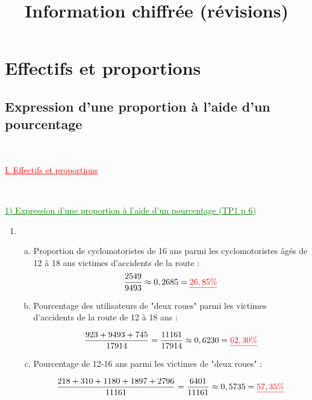 \documentclass[xcolor={dvipsnames}]{beamer}
\title{Information chiffrée (révisions)}
\begin{document}
\begin{frame}
  \titlepage 
\end{frame}


	



\section{Effectifs et proportions}

\subsection{Expression d'une proportion à l'aide d'un pourcentage }


\begin{frame}
\

\begin{Large}
	\textcolor{Red}{\underline{I. Effectifs et proportions }}
\end{Large}\pause
\

\vspace*{1cm}

\textcolor{Green}{\underline{1) Expression d'une proportion à l'aide d'un pourcentage (TP1 p 6)}}
\end{frame}

\begin{frame}{}
	
\begin{enumerate}%
	\item 
	\begin{enumerate} [a)]
		\item Proportion de cyclomotoristes de 16 ans parmi les cyclomotoristes âgés de 12 à 18 ans victimes d'accidents de la route :\pause
		\begin{eqnarray*}
			\dfrac{2549}{9493} \approx 0,2685 = \textcolor{red}{\underline{26,85\%}}
		\end{eqnarray*}\pause
		
		\item Pourcentage des utilisateurs de "deux roues" parmi les victimes d'accidents de la route de 12 à 18 ans :\pause
		
		\begin{equation*}
		\dfrac{923 + 9493 + 745}{17914} = \dfrac{11 161}{17914} \approx 0,6230 = \textcolor{red}{\underline{62,30 \%}}
		\end{equation*}\pause
		
		\item Pourcentage de 12-16 ans parmi les victimes de "deux roues" :\pause
		
		\begin{equation*}
		\dfrac{218 + 310 + 1180 + 1897 + 2796}{11161} = \dfrac{6401}{11161} \approx 0,5735 = \textcolor{red}{\underline{57,35 \%}}
		\end{equation*}\pause
	\end{enumerate}
\end{enumerate}
\end{frame}
\end{document}
